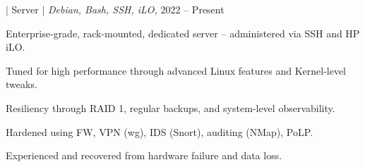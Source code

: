 \begin{project}{\textbf{\laniakea} $|$ Server $|$ \textit{Debian,
    Bash, SSH, iLO, }}{2022 -- Present}
  \item Enterprise-grade, rack-mounted, dedicated server --
    administered via SSH and HP iLO.
  \item Tuned for high performance through advanced Linux features
    and Kernel-level tweaks.
  \item Resiliency through RAID 1, regular backups, and system-level
    observability.
  \item Hardened using FW, VPN (wg), IDS (Snort), auditing (NMap), PoLP.
  \item Experienced and recovered from hardware failure and data loss.
  \end{project}